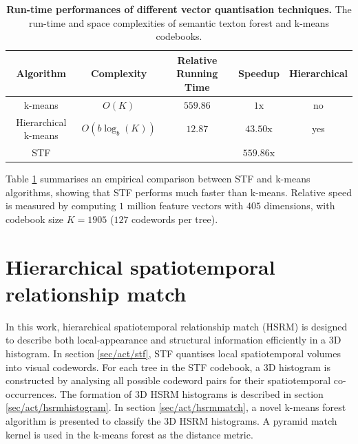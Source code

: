 \begin{table}
	\begin{center}
		\begin{tabular}{|c|c|c|c|c|}
			\hline
			\textbf{ Algorithm} & \textbf{ Complexity} & \parbox{3cm}{\centering\textbf{Relative Running Time}} & \textbf{Speedup} & \textbf{ Hierarchical} \\
			\hline
			k-means & $O(K)$ & $559.86$ & $1\mathrm{x}$ & no \\
			Hierarchical k-means & $O(b\log_{b}(K))$ & $12.87$ & $43.50\mathrm{x}$ & yes \\
			{STF} & \textbf{} & \textbf{\color{blue}{$1$}} & \textbf{\color{blue}$559.86\mathrm{x}$} &  \textbf{\color{blue}{yes}}\\
			\hline
		\end{tabular}
	\end{center}
	\caption{\textbf{Run-time performances of different vector quantisation techniques.} The run-time and space complexities of semantic texton forest and k-means codebooks.}
	\label{tab/act/codebook}
\end{table}

Table \ref{tab/act/codebook} summarises an empirical comparison between STF and k-means algorithms, showing that STF performs much faster than k-means. Relative speed is measured by computing $1$ million feature vectors with $405$ dimensions, with codebook size $K = 1905$ ($127$ codewords per tree). 

\section{Hierarchical spatiotemporal relationship match}
\label{sec/act/HSRM}

In this work, hierarchical spatiotemporal relationship match (HSRM) is designed to describe both local-appearance and structural information efficiently in a 3D histogram. 
In section \ref{sec/act/stf}, STF quantises local spatiotemporal volumes into visual codewords. 
For each tree in the STF codebook, a 3D histogram is constructed by analysing all possible codeword pairs for their spatiotemporal co-occurrences. The formation of 3D HSRM histograms is described in section \ref{sec/act/hsrmhistogram}. In section \ref{sec/act/hsrmmatch}, a novel k-means forest algorithm is presented to classify the 3D HSRM histograms. A pyramid match kernel is used in the k-means forest as the distance metric.

